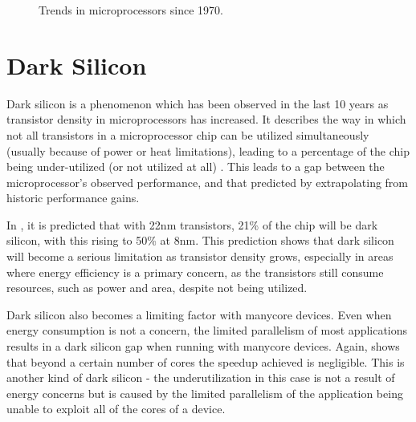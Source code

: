 \documentclass{UoYCSproject}
\begin{document}
\begin{figure}[h]
\caption{Trends in microprocessors since 1970. \cite{karlrupp}}
\label{fig:microprocessorTrends}
\end{figure}

\section{Dark Silicon}

Dark silicon is a phenomenon which has been observed in the last 10 years as transistor density in microprocessors
has increased. It describes the way in which not all transistors in a microprocessor chip can be utilized simultaneously
(usually because of power or heat limitations), leading to a percentage of the chip being under-utilized
(or not utilized at all) \cite{four-horsemen}. This leads to a gap between the microprocessor's observed performance,
and that predicted by extrapolating from historic performance gains.

In \cite{darksilicon}, it is predicted that with 22nm transistors, 21\% of the chip will be dark silicon,
with this rising to 50\% at 8nm. This prediction shows that dark silicon will become a serious limitation
as transistor density grows, especially in areas where energy efficiency is a primary concern, as the transistors
still consume resources, such as power and area, despite not being utilized.

Dark silicon also becomes a limiting factor with manycore devices. Even when energy consumption is not a
concern, the limited parallelism of most applications results in a dark silicon gap when running with
manycore devices. Again, \cite{darksilicon} shows that beyond a certain number of cores the speedup achieved
is negligible. This is another kind of dark silicon - the underutilization in this case is not a result of
energy concerns but is caused by the limited parallelism of the application being unable to exploit all of
the cores of a device.
\end{document}
